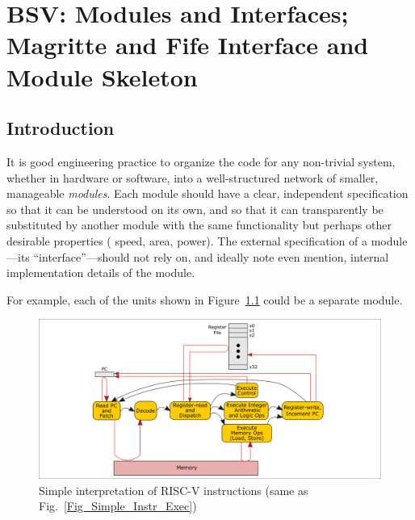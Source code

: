 

\chapter{BSV: Modules and Interfaces; \\
Magritte and Fife Interface and Module Skeleton}


\setcounter{page}{1}
\renewcommand{\thepage}{\arabic{chapter}-\arabic{page}}

\label{ch_Module_Skeleton}


\section{Introduction}

It is good engineering practice to organize the code for any
non-trivial system, whether in hardware or software, into a
well-structured network of smaller, manageable \emph{modules}.  Each
module should have a clear, independent specification so that it can
be understood on its own, and so that it can transparently be
substituted by another module with the same functionality but perhaps
other desirable properties ({\eg} speed, area, power).  The external
specification of a module---its ``interface''---should not rely on,
and ideally note even mention, internal implementation details of the
module.

For example, each of the units shown in
Figure~\ref{Fig_CPU_Module_Skeleton_Simple_Instr_Exec} could be a
separate module.
\begin{figure}[htbp]
  \centerline{\includegraphics[width=6in,angle=0]{ch030_RISCV_Design_Space/Figures/Fig_Simple_Instr_Exec}}
  \caption{\label{Fig_CPU_Module_Skeleton_Simple_Instr_Exec}Simple interpretation of RISC-V instructions (same as Fig.~\ref{Fig_Simple_Instr_Exec})}
\end{figure}


